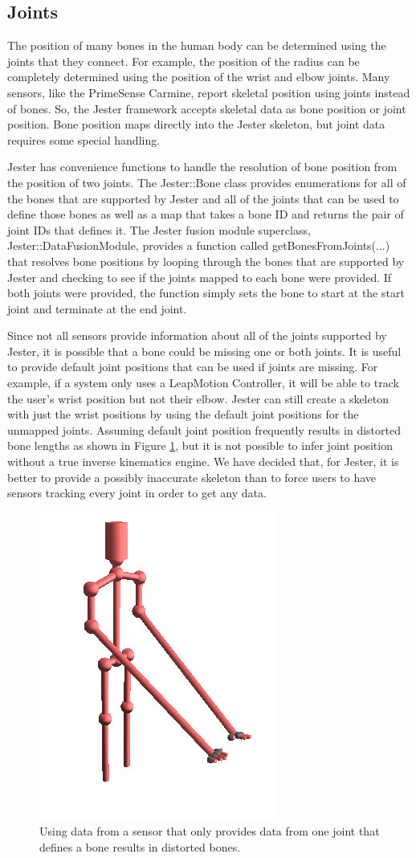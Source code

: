 \subsection{Joints}

The position of many bones in the human body can be determined using the joints that they connect. For example, the position of the radius can be completely determined using the position of the wrist and elbow joints. Many sensors, like the PrimeSense Carmine, report skeletal position using joints instead of bones. So, the Jester framework accepts skeletal data as bone position or joint position. Bone position maps directly into the Jester skeleton, but joint data requires some special handling.

Jester has convenience functions to handle the resolution of bone position from the position of two joints. The Jester::Bone class provides enumerations for all of the bones that are supported by Jester and all of the joints that can be used to define those bones as well as a map that takes a bone ID and returns the pair of joint IDs that defines it. The Jester fusion module superclass, \mbox{Jester::DataFusionModule}, provides a function called \mbox{getBonesFromJoints(...)} that resolves bone positions by looping through the bones that are supported by Jester and checking to see if the joints mapped to each bone were provided. If both joints were provided, the function simply sets the bone to start at the start joint and terminate at the end joint. 

Since not all sensors provide information about all of the joints supported by Jester, it is possible that a bone could be missing one or both joints. It is useful to provide default joint positions that can be used if joints are missing. For example, if a system only uses a LeapMotion Controller, it will be able to track the user's wrist position but not their elbow. Jester can still create a skeleton with just the wrist positions by using the default joint positions for the unmapped joints. Assuming default joint position frequently results in distorted bone lengths as shown in Figure \ref{fig:distorted_bones}, but it is not possible to infer joint position without a true inverse kinematics engine. We have decided that, for Jester, it is better to provide a possibly inaccurate skeleton than to force users to have sensors tracking every joint in order to get any data.

\begin{figure}[]
\centering
\includegraphics[width=.3\textwidth]{figures/distortedBones}
\caption{Using data from a sensor that only provides data from one joint that defines a bone results in distorted bones.}
\label{fig:distorted_bones}
\end{figure}

